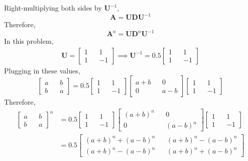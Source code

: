\documentclass[11pt, oneside]{article}   	%
\begin{document}
Right-multiplying both sides by $\boldsymbol{U}^{-1}$,
\begin{equation}
\boldsymbol{A} = \boldsymbol{U} \boldsymbol{D} \boldsymbol{U}^{-1}
\end{equation}
Therefore,
\begin{equation}
\boldsymbol{A}^n = \boldsymbol{U} \boldsymbol{D}^n \boldsymbol{U}^{-1}
\end{equation}
In this problem,
\begin{align}
\boldsymbol{U} = \begin{bmatrix}
1 && 1 \\
1 && -1
\end{bmatrix} \implies
\boldsymbol{U}^{-1} = 0.5\begin{bmatrix}
1 && 1 \\
1 && -1
\end{bmatrix}
\end{align}
Plugging in these values,
\begin{equation}
\begin{bmatrix}
a && b \\
b && a
\end{bmatrix} = 0.5 \begin{bmatrix}
1 && 1 \\
1 && -1
\end{bmatrix} \begin{bmatrix}
a+b && 0 \\
0 && a-b
\end{bmatrix} \begin{bmatrix}
1 && 1 \\
1 && -1
\end{bmatrix}
\end{equation}
Therefore,
\begin{align}
\begin{bmatrix}
a && b \\
b && a
\end{bmatrix}^n &= 0.5 \begin{bmatrix}
1 && 1 \\
1 && -1
\end{bmatrix} \begin{bmatrix}
(a+b)^n && 0 \\
0 && (a-b)^n
\end{bmatrix} \begin{bmatrix}
1 && 1 \\
1 && -1
\end{bmatrix} \\
&= 0.5\begin{bmatrix}
(a+b)^n + (a-b)^n && (a+b)^n - (a-b)^n \\
(a+b)^n - (a-b)^n && (a+b)^n + (a-b)^n
\end{bmatrix}



\end{align}
\end{document}
